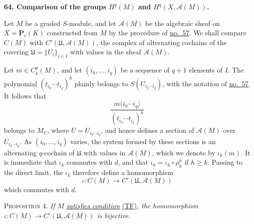 
\label{fac:III:3:no:64}
\textbf{64. Comparison of the groups $H^q(M)$ and
$H^q(X,\mathcal{A}(M))$.}

Let $M$ be a graded $S$-module, and let $\mathcal{A}(M)$ be the algebraic
sheaf on $X=\mathbf{P}_r(K)$ constructed from $M$ by the procedure of
\hyperref[fac:III:2:no:57]{no.~57}. We shall compare $C(M)$ with
$C'(\mathfrak{U},\mathcal{A}(M))$, the complex of alternating cochains of
the covering $\mathfrak{U}=\{U_i\}_{i\in I}$ with values in the sheaf
$\mathcal{A}(M)$.

Let $m\in C_k^q(M)$, and let $(i_0,\ldots,i_q)$ be a sequence of $q+1$
elements of $I$. The polynomial $(t_{i_0}\cdots t_{i_q})^k$ plainly
belongs to $S(U_{i_0\cdots i_q})$, with the notation of
\hyperref[fac:III:2:no:57]{no.~57}. It follows
that
\[
\frac{m\langle i_0\cdots i_q\rangle}
     {(t_{i_0}\cdots t_{i_q})^k}
\]
belongs to $M_U$, where $U=U_{i_0\cdots i_q}$, and hence defines a
section of $\mathcal{A}(M)$ over $U_{i_0\cdots i_q}$. As
$(i_0,\ldots,i_q)$ varies, the system formed by these sections is an
alternating $q$-cochain of $\mathfrak{U}$ with values in
$\mathcal{A}(M)$, which we denote by $\iota_k(m)$. It is immediate that
$\iota_k$ commutes with $d$, and that
$\iota_k=\iota_h\circ\rho_k^h$ if $h\geq k$. Passing to the direct limit,
the $\iota_k$ therefore define a homomorphism
\label{fac:III:3:no:64:map:iota}
\[
\iota:C(M)\longrightarrow C'(\mathfrak{U},\mathcal{A}(M))
\]
which commutes with $d$.

\label{fac:III:3:no:64:prop:4}
\textsc{Proposition 4.} \textit{If $M$
\hyperref[fac:III:2:no:56:def:TF]{satisfies condition}}
\hyperref[fac:III:2:no:56:def:TF]{(TF)}\textit{, the homomorphism
$\iota:C(M)\to C'(\mathfrak{U},\mathcal{A}(M))$ is bijective.}

